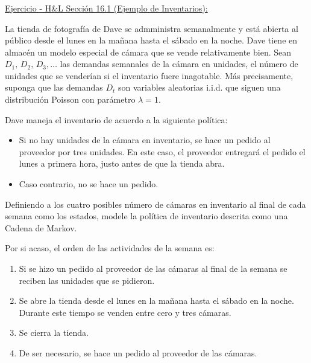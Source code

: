 \documentclass[ 10pt, xcolor = dvipsnames]{beamer}
\begin{document}
\begin{frame}[allowframebreaks]
\frametitle{\insertsubsection}

\underline{Ejercicio - H\&L Secci\'on 16.1 (Ejemplo de Inventarios):}

La tienda de fotograf\'ia de Dave se admministra semanalmente y est\'a abierta al p\'ublico desde el lunes en la ma\~nana hasta el s\'abado en la noche. Dave tiene en almac\'en un modelo especial de c\'amara que se vende relativamente bien. \linebreak Sean $D_1, \, D_2, \, D_3, \dots$ las demandas semanales de la c\'amara en unidades, \linebreak \ie el n\'umero de unidades que se vender\'ian si el inventario fuere inagotable. \linebreak M\'as precisamente, suponga que las demandas $D_t$ son variables aleatorias i.i.d. \linebreak que siguen una distribuci\'on Poisson con par\'ametro $\lambda = 1$. 

Dave maneja el inventario de acuerdo a la siguiente pol\'itica:
\begin{itemize}
\item Si no hay unidades de la c\'amara en inventario, se hace un pedido al proveedor por tres unidades. En este caso, el proveedor entregar\'a el pedido \linebreak el lunes a primera hora, justo antes de que la tienda abra. 
\item Caso contrario, no se hace un pedido. 
\end{itemize}
\framebreak

Definiendo a los cuatro posibles n\'umero de c\'amaras en inventario al final de cada semana como los estados, modele la pol\'itica de inventario descrita como una Cadena de Markov. 

Por si acaso, el orden de las actividades de la \tava semana es: 
\begin{enumerate}
\item Si se hizo un pedido al proveedor de las c\'amaras al final de la \linebreak \tmava semana se reciben las unidades que se pidieron. 
\item Se abre la tienda desde el lunes en la ma\~nana hasta el s\'abado en la noche. Durante este tiempo se venden entre cero y tres c\'amaras. 
\item Se cierra la tienda. 
\item De ser necesario, se hace un pedido al proveedor de las c\'amaras. 
\end{enumerate}
\framebreak


\end{frame}
\end{document}
